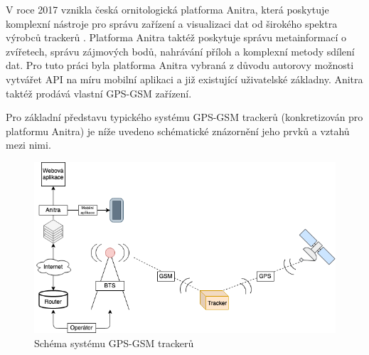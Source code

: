 V roce 2017 vznikla česká ornitologická platforma Anitra, která poskytuje komplexní nástroje pro správu zařízení a visualizaci dat od širokého spektra výrobců trackerů \cite{krouzkovaniPtakuAnitra}. Platforma Anitra taktéž poskytuje správu metainformací o zvířetech, správu zájmových bodů, nahrávání příloh a komplexní metody sdílení dat. Pro tuto práci byla platforma Anitra vybraná z důvodu autorovy možnosti vytvářet API na míru mobilní aplikaci a již existující uživatelské základny. Anitra taktéž prodává vlastní GPS-GSM zařízení.

Pro základní představu typického systému GPS-GSM trackerů (konkretizován pro platformu Anitra) je níže uvedeno schématické znázornění jeho prvků a vztahů mezi nimi.

\begin{figure}[h]
	\includegraphics[width=\linewidth]{img/diagram_system.png}
	\caption{Schéma systému GPS-GSM trackerů}
	\label{fig:boat1}
\end{figure}